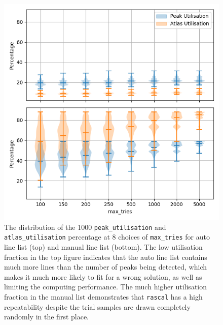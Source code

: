 \documentclass[fleqn,usenatbib]{rasti}
\begin{document}
\begin{figure}[h]
    \centering
    \includegraphics[width=\columnwidth]{plots/figure_3_peak_atlas_utilisation.png}
    \caption{The distribution of the 1000 \texttt{peak\_utilisation} and
    \texttt{atlas\_utilisation} percentage at 8 choices of \texttt{max\_tries} for auto
    line list (top) and manual line list (bottom). The low utilisation fraction in the
    top figure indicates that the auto line list contains much more lines than the
    number of peaks being detected, which makes it much more likely to fit for a wrong
    solution, as well as limiting the computing performance. The much higher
    utilisation fraction in the manual list demonstrates that \texttt{rascal} has a
    high repeatability despite the trial samples are drawn completely randomly in the
    first place.}
    \label{fig:peak_utilisation}
\end{figure}
\end{document}
